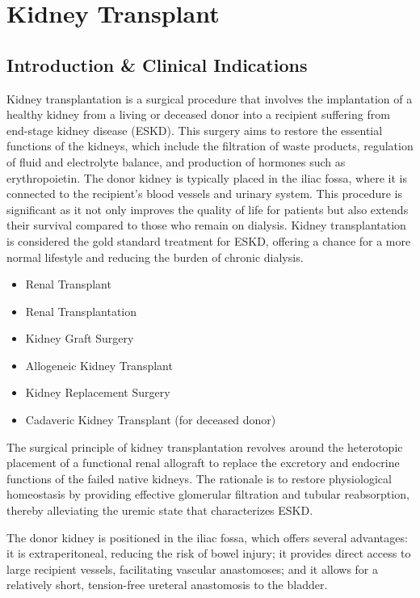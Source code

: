 \chapter{Kidney Transplant}

\section*{Introduction \& Clinical Indications}
Kidney transplantation is a surgical procedure that involves the implantation of a healthy kidney from a living or deceased donor into a recipient suffering from end-stage kidney disease (ESKD). This surgery aims to restore the essential functions of the kidneys, which include the filtration of waste products, regulation of fluid and electrolyte balance, and production of hormones such as erythropoietin. The donor kidney is typically placed in the iliac fossa, where it is connected to the recipient's blood vessels and urinary system. This procedure is significant as it not only improves the quality of life for patients but also extends their survival compared to those who remain on dialysis. Kidney transplantation is considered the gold standard treatment for ESKD, offering a chance for a more normal lifestyle and reducing the burden of chronic dialysis.

\begin{itemize}
  \item Renal Transplant
  \item Renal Transplantation
  \item Kidney Graft Surgery
  \item Allogeneic Kidney Transplant
  \item Kidney Replacement Surgery
  \item Cadaveric Kidney Transplant (for deceased donor)
\end{itemize}

The surgical principle of kidney transplantation revolves around the heterotopic placement of a functional renal allograft to replace the excretory and endocrine functions of the failed native kidneys. The rationale is to restore physiological homeostasis by providing effective glomerular filtration and tubular reabsorption, thereby alleviating the uremic state that characterizes ESKD. 

The donor kidney is positioned in the iliac fossa, which offers several advantages: it is extraperitoneal, reducing the risk of bowel injury; it provides direct access to large recipient vessels, facilitating vascular anastomoses; and it allows for a relatively short, tension-free ureteral anastomosis to the bladder. 

